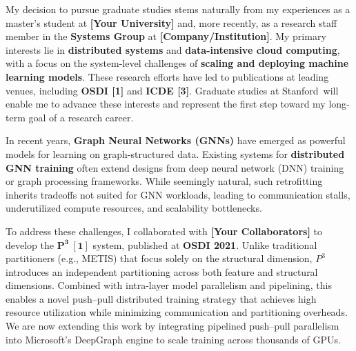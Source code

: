 \documentclass{article}
\newcommand{\school}{Stanford\xspace}
\begin{document}

My decision to pursue graduate studies stems naturally from my experiences as a master’s student at \textbf{[Your University]} and, more recently, as a research staff member in the \textbf{Systems Group} at \textbf{[Company/Institution]}. My primary interests lie in \textbf{distributed systems} and \textbf{data-intensive cloud computing}, with a focus on the system-level challenges of \textbf{scaling and deploying machine learning models}. These research efforts have led to publications at leading venues, including \textbf{OSDI [1]} and \textbf{ICDE [3]}. Graduate studies at \school\ will enable me to advance these interests and represent the first step toward my long-term goal of a research career.



In recent years, \textbf{Graph Neural Networks (GNNs)} have emerged as powerful models for learning on graph-structured data. Existing systems for \textbf{distributed GNN training} often extend designs from deep neural network (DNN) training or graph processing frameworks. While seemingly natural, such retrofitting inherits tradeoffs not suited for GNN workloads, leading to communication stalls, underutilized compute resources, and scalability bottlenecks. 

To address these challenges, I collaborated with \textbf{[Your Collaborators]} to develop the $\mathbf{P^{3}~[1]}$ system, published at \textbf{OSDI 2021}. Unlike traditional partitioners (e.g., METIS) that focus solely on the structural dimension, $P^{3}$ introduces an independent partitioning across both feature and structural dimensions. Combined with intra-layer model parallelism and pipelining, this enables a novel push--pull distributed training strategy that achieves high resource utilization while minimizing communication and partitioning overheads. We are now extending this work by integrating pipelined push--pull parallelism into Microsoft’s DeepGraph engine to scale training across thousands of GPUs.

\end{document}
